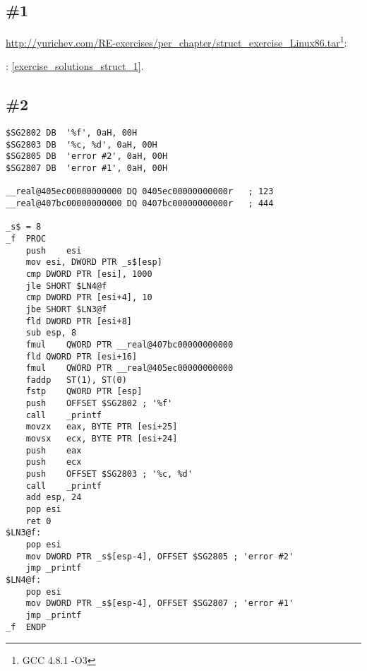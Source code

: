 \section{\Exercises}

\subsection{\Exercise \#1}
\label{exercise_struct_1}

\url{http://yurichev.com/RE-exercises/per_chapter/struct_exercise_Linux86.tar}\footnote{GCC 4.8.1 -O3}:\\

\Answer{}: \ref{exercise_solutions_struct_1}.

\subsection{\Exercise \#2}
\label{exercise_struct_2}


\begin{lstlisting}[caption=MSVC 2010 /Ox]
$SG2802	DB	'%f', 0aH, 00H
$SG2803	DB	'%c, %d', 0aH, 00H
$SG2805	DB	'error #2', 0aH, 00H
$SG2807	DB	'error #1', 0aH, 00H

__real@405ec00000000000 DQ 0405ec00000000000r	; 123
__real@407bc00000000000 DQ 0407bc00000000000r	; 444

_s$ = 8
_f	PROC
	push	esi
	mov	esi, DWORD PTR _s$[esp]
	cmp	DWORD PTR [esi], 1000
	jle	SHORT $LN4@f
	cmp	DWORD PTR [esi+4], 10
	jbe	SHORT $LN3@f
	fld	DWORD PTR [esi+8]
	sub	esp, 8
	fmul	QWORD PTR __real@407bc00000000000
	fld	QWORD PTR [esi+16]
	fmul	QWORD PTR __real@405ec00000000000
	faddp	ST(1), ST(0)
	fstp	QWORD PTR [esp]
	push	OFFSET $SG2802 ; '%f'
	call	_printf
	movzx	eax, BYTE PTR [esi+25]
	movsx	ecx, BYTE PTR [esi+24]
	push	eax
	push	ecx
	push	OFFSET $SG2803 ; '%c, %d'
	call	_printf
	add	esp, 24
	pop	esi
	ret	0
$LN3@f:
	pop	esi
	mov	DWORD PTR _s$[esp-4], OFFSET $SG2805 ; 'error #2'
	jmp	_printf
$LN4@f:
	pop	esi
	mov	DWORD PTR _s$[esp-4], OFFSET $SG2807 ; 'error #1'
	jmp	_printf
_f	ENDP
\end{lstlisting}

